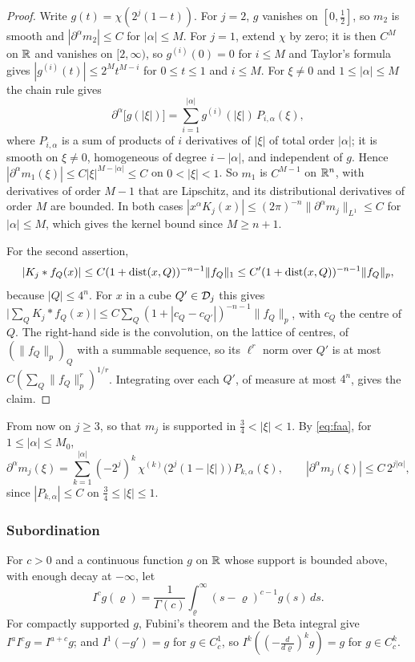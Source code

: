 \begin{proof}
Write $g(t)=\chi(2^j(1-t))$. For $j=2$, $g$ vanishes on $[0,\frac12]$, so $m_2$ is smooth and
$|\partial^\alpha m_2|\le C$ for $|\alpha|\le M$. For $j=1$, extend $\chi$ by zero; it is then $C^M$
on $\mathbb{R}$ and vanishes on $[2,\infty)$, so $g^{(i)}(0)=0$ for $i\le M$ and Taylor's formula gives
$|g^{(i)}(t)|\le2^Mt^{M-i}$ for $0\le t\le1$ and $i\le M$. For $\xi\ne0$ and $1\le|\alpha|\le M$ the
chain rule gives
\begin{equation}\label{eq:faa}
\partial^\alpha\bigl[g(|\xi|)\bigr]=\sum_{i=1}^{|\alpha|}g^{(i)}(|\xi|)\,P_{i,\alpha}(\xi),
\end{equation}
where $P_{i,\alpha}$ is a sum of products of $i$ derivatives of $|\xi|$ of total order $|\alpha|$; it is
smooth on $\xi\ne0$, homogeneous of degree $i-|\alpha|$, and independent of $g$. Hence
$|\partial^\alpha m_1(\xi)|\le C|\xi|^{M-|\alpha|}\le C$ on $0<|\xi|<1$. So $m_1$ is $C^{M-1}$ on $\mathbb{R}^n$,
with derivatives of order $M-1$ that are Lipschitz, and its distributional derivatives of order $M$
are bounded. In both cases $|x^\alpha K_j(x)|\le(2\pi)^{-n}\|\partial^\alpha m_j\|_{L^1}\le C$ for
$|\alpha|\le M$, which gives the kernel bound since $M\ge n+1$.

For the second assertion,
\[
|K_j*f_Q(x)|\le C(1+\operatorname{dist}(x,Q))^{-n-1}\|f_Q\|_1\le C'(1+\operatorname{dist}(x,Q))^{-n-1}\|f_Q\|_p ,
\]
because $|Q|\le4^n$. For $x$ in a cube $Q'\in\mathcal D_j$ this gives
$\bigl|\sum_QK_j*f_Q(x)\bigr|\le C\sum_Q(1+|c_Q-c_{Q'}|)^{-n-1}\|f_Q\|_p$, with $c_Q$ the centre of $Q$.
The right-hand side is the convolution, on the lattice of centres, of $(\|f_Q\|_p)_Q$ with a summable
sequence, so its $\ell^r$ norm over $Q'$ is at most $C(\sum_Q\|f_Q\|_p^r)^{1/r}$. Integrating over each
$Q'$, of measure at most $4^n$, gives the claim.
\end{proof}

From now on $j\ge3$, so that $m_j$ is supported in $\frac34<|\xi|<1$. By \eqref{eq:faa}, for
$1\le|\alpha|\le M_0$,
\begin{equation}\label{eq:dmj}
\partial^\alpha m_j(\xi)=\sum_{k=1}^{|\alpha|}(-2^j)^k\,\chi^{(k)}\bigl(2^j(1-|\xi|)\bigr)\,P_{k,\alpha}(\xi),
\qquad |\partial^\alpha m_j(\xi)|\le C\,2^{j|\alpha|} ,
\end{equation}
since $|P_{k,\alpha}|\le C$ on $\frac34\le|\xi|\le1$.

\subsubsection*{Subordination}
For $c>0$ and a continuous function $g$ on $\mathbb{R}$ whose support is bounded above, with enough decay at
$-\infty$, let
\[
I^cg(\varrho)=\frac1{\Gamma(c)}\int_\varrho^\infty(s-\varrho)^{c-1}g(s)\,ds .
\]
For compactly supported $g$, Fubini's theorem and the Beta integral give $I^aI^cg=I^{a+c}g$; and
$I^1(-g')=g$ for $g\in C^1_c$, so $I^k((-\tfrac{d}{d\varrho})^kg)=g$ for $g\in C^k_c$.


